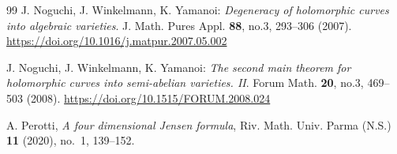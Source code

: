 \documentclass[11pt]{amsart}
\numberwithin{equation}{section}
\theoremstyle{definition}
\theoremstyle{remark}
\begin{document}
\begin{thebibliography}{99}
  J. Noguchi, J. Winkelmann, K. Yamanoi: \emph{Degeneracy of holomorphic curves into algebraic varieties}. J. Math. Pures Appl. \textbf{88}, no.3, 293--306 (2007). \url{https://doi.org/10.1016/j.matpur.2007.05.002}
  
  J. Noguchi, J. Winkelmann, K. Yamanoi: \emph{The second main theorem for holomorphic curves into semi-abelian varieties. {II}}. Forum Math. \textbf{20}, no.3, 469--503 (2008). \url{https://doi.org/10.1515/FORUM.2008.024}
  
  A. Perotti, \textit{A four dimensional Jensen formula}, Riv. Math. Univ. Parma (N.S.) \textbf{11} (2020), no.~1, 139--152.
  
\end{thebibliography}
\end{document}
